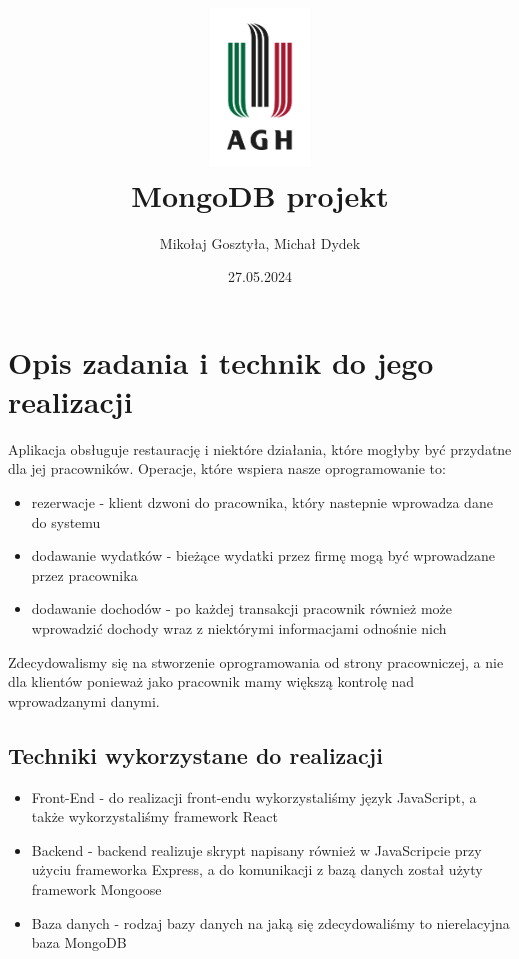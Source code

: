 \documentclass[12pt]{article}
\title{\includegraphics[width=0.2\textwidth]{agh.jpg} \\ \textbf{MongoDB projekt}}
\author{Mikołaj Gosztyła, Michał Dydek}
\date{27.05.2024}
\begin{document}
\maketitle

\hypersetup{
    linktoc=all
}
\tableofcontents

\newpage
\section{Opis zadania i technik do jego realizacji}
Aplikacja obsługuje restaurację i niektóre działania, które mogłyby być przydatne dla jej pracowników. Operacje, które wspiera nasze oprogramowanie to: 
\begin{itemize}
	\item rezerwacje - klient dzwoni do pracownika, który nastepnie wprowadza dane do systemu
	\item dodawanie wydatków - bieżące wydatki przez firmę mogą być wprowadzane przez pracownika
	\item dodawanie dochodów - po każdej transakcji pracownik również może wprowadzić dochody wraz z niektórymi informacjami odnośnie nich 
\end{itemize}

Zdecydowalismy się na stworzenie oprogramowania od strony pracowniczej, a nie dla klientów ponieważ jako pracownik mamy większą kontrolę nad wprowadzanymi danymi.

\subsection{Techniki wykorzystane do realizacji}
\begin{itemize}
	\item Front-End - do realizacji front-endu wykorzystaliśmy język JavaScript, a także wykorzystaliśmy framework React
	\item Backend - backend realizuje skrypt napisany również w JavaScripcie przy użyciu frameworka Express, a do komunikacji z bazą danych został użyty framework Mongoose
	\item Baza danych - rodzaj bazy danych na jaką się zdecydowaliśmy to nierelacyjna baza MongoDB 
\end{itemize}

\newpage
\end{document}

